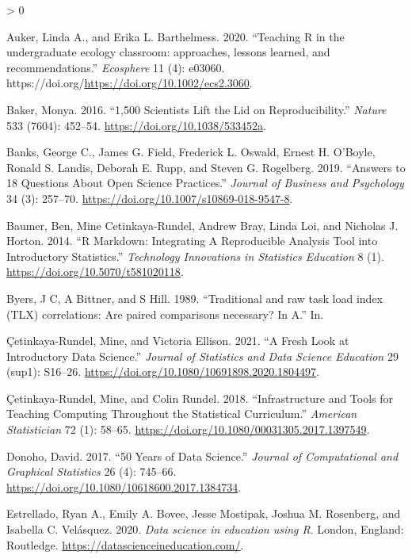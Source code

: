 \documentclass[
]{article}
\newlength{\cslhangindent}
\newenvironment{CSLReferences}[2] %
 {%
  \setlength{\parindent}{0pt}
  \ifodd #1 \everypar{\setlength{\hangindent}{\cslhangindent}}\ignorespaces\fi
  \ifnum #2 > 0
  \setlength{\parskip}{#2\baselineskip}
  \fi
 }%
 {}
\begin{document}
\hypertarget{refs}{}
\begin{CSLReferences}{1}{0}
\leavevmode\hypertarget{ref-Auker2020}{}%
Auker, Linda A., and Erika L. Barthelmess. 2020. {``{Teaching R in the
undergraduate ecology classroom: approaches, lessons learned, and
recommendations}.''} \emph{Ecosphere} 11 (4): e03060.
https://doi.org/\url{https://doi.org/10.1002/ecs2.3060}.

\leavevmode\hypertarget{ref-Baker2016}{}%
Baker, Monya. 2016. {``1,500 Scientists Lift the Lid on
Reproducibility.''} \emph{Nature} 533 (7604): 452--54.
\url{https://doi.org/10.1038/533452a}.

\leavevmode\hypertarget{ref-Banks2019}{}%
Banks, George C., James G. Field, Frederick L. Oswald, Ernest H.
O'Boyle, Ronald S. Landis, Deborah E. Rupp, and Steven G. Rogelberg.
2019. {``{Answers to 18 Questions About Open Science Practices}.''}
\emph{Journal of Business and Psychology} 34 (3): 257--70.
\url{https://doi.org/10.1007/s10869-018-9547-8}.

\leavevmode\hypertarget{ref-Baumer2014}{}%
Baumer, Ben, Mine Cetinkaya-Rundel, Andrew Bray, Linda Loi, and Nicholas
J. Horton. 2014. {``{R Markdown: Integrating A Reproducible Analysis
Tool into Introductory Statistics}.''} \emph{Technology Innovations in
Statistics Education} 8 (1). \url{https://doi.org/10.5070/t581020118}.

\leavevmode\hypertarget{ref-Byers1989}{}%
Byers, J C, A Bittner, and S Hill. 1989. {``{Traditional and raw task
load index (TLX) correlations: Are paired comparisons necessary? In
A}.''} In.

\leavevmode\hypertarget{ref-Cetinkaya-Rundel2021}{}%
Çetinkaya-Rundel, Mine, and Victoria Ellison. 2021. {``{A Fresh Look at
Introductory Data Science}.''} \emph{Journal of Statistics and Data
Science Education} 29 (sup1): S16--26.
\url{https://doi.org/10.1080/10691898.2020.1804497}.

\leavevmode\hypertarget{ref-Cetinkaya-Rundel2018}{}%
Çetinkaya-Rundel, Mine, and Colin Rundel. 2018. {``{Infrastructure and
Tools for Teaching Computing Throughout the Statistical Curriculum}.''}
\emph{American Statistician} 72 (1): 58--65.
\url{https://doi.org/10.1080/00031305.2017.1397549}.

\leavevmode\hypertarget{ref-Donoho2017}{}%
Donoho, David. 2017. {``{50 Years of Data Science}.''} \emph{Journal of
Computational and Graphical Statistics} 26 (4): 745--66.
\url{https://doi.org/10.1080/10618600.2017.1384734}.

\leavevmode\hypertarget{ref-Estrellado2020}{}%
Estrellado, Ryan A., Emily A. Bovee, Jesse Mostipak, Joshua M.
Rosenberg, and Isabella C. Velásquez. 2020. \emph{{Data science in
education using R}}. London, England: Routledge.
\url{https://datascienceineducation.com/}.


\end{CSLReferences}
\end{document}
